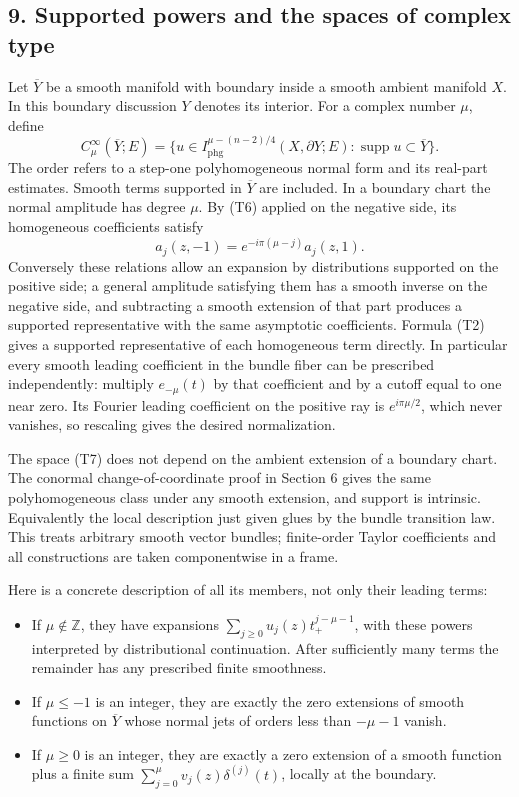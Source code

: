 \documentclass[
  11pt,
]{article}
\providecommand{\tightlist}{%
  \setlength{\itemsep}{0pt}\setlength{\parskip}{0pt}}
\begin{document}
\subsection{9. Supported powers and the spaces of complex
type}\label{supported-powers-and-the-spaces-of-complex-type}

Let \(\overline Y\) be a smooth manifold with boundary inside a smooth
ambient manifold \(X\). In this boundary discussion \(Y\) denotes its
interior. For a complex number \(\mu\), define \[
C_\mu^\infty(\overline Y;E)
=\{u\in I_{\mathrm{phg}}^{\mu-(n-2)/4}(X,\partial Y;E):
\operatorname{supp}u\subset\overline Y\}.
\tag{T7}
\] The order refers to a step-one polyhomogeneous normal form and its
real-part estimates. Smooth terms supported in \(\overline Y\) are
included. In a boundary chart the normal amplitude has degree \(\mu\).
By (T6) applied on the negative side, its homogeneous coefficients
satisfy \[
a_j(z,-1)=e^{-i\pi(\mu-j)}a_j(z,1).
\tag{T8}
\] Conversely these relations allow an expansion by distributions
supported on the positive side; a general amplitude satisfying them has
a smooth inverse on the negative side, and subtracting a smooth
extension of that part produces a supported representative with the same
asymptotic coefficients. Formula (T2) gives a supported representative
of each homogeneous term directly. In particular every smooth leading
coefficient in the bundle fiber can be prescribed independently:
multiply \(e_{-\mu}(t)\) by that coefficient and by a cutoff equal to
one near zero. Its Fourier leading coefficient on the positive ray is
\(e^{i\pi\mu/2}\), which never vanishes, so rescaling gives the desired
normalization.

The space (T7) does not depend on the ambient extension of a boundary
chart. The conormal change-of-coordinate proof in Section 6 gives the
same polyhomogeneous class under any smooth extension, and support is
intrinsic. Equivalently the local description just given glues by the
bundle transition law. This treats arbitrary smooth vector bundles;
finite-order Taylor coefficients and all constructions are taken
componentwise in a frame.

Here is a concrete description of all its members, not only their
leading terms:

\begin{itemize}
\tightlist
\item
  If \(\mu\notin\mathbb Z\), they have expansions
  \(\sum_{j\geq0}u_j(z)t_+^{j-\mu-1}\), with these powers interpreted by
  distributional continuation. After sufficiently many terms the
  remainder has any prescribed finite smoothness.
\item
  If \(\mu\leq-1\) is an integer, they are exactly the zero extensions
  of smooth functions on \(\overline Y\) whose normal jets of orders
  less than \(-\mu-1\) vanish.
\item
  If \(\mu\geq0\) is an integer, they are exactly a zero extension of a
  smooth function plus a finite sum
  \(\sum_{j=0}^{\mu}v_j(z)\delta^{(j)}(t)\), locally at the boundary.
\end{itemize}
\end{document}
